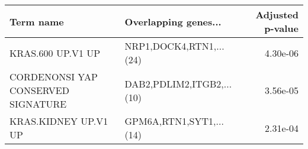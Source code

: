 \begin{tabular}{llr}
\toprule
                         Term name &      Overlapping genes... &  Adjusted p-value \\
\midrule
                 KRAS.600 UP.V1 UP &   NRP1,DOCK4,RTN1,...(24) &          4.30e-06 \\
CORDENONSI YAP CONSERVED SIGNATURE & DAB2,PDLIM2,ITGB2,...(10) &          3.56e-05 \\
              KRAS.KIDNEY UP.V1 UP &   GPM6A,RTN1,SYT1,...(14) &          2.31e-04 \\
\bottomrule
\end{tabular}
